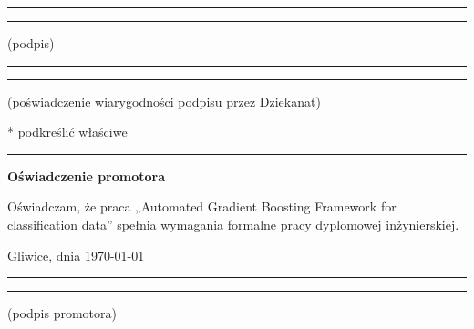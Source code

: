 \documentclass[a4paper,twoside,12pt]{book}
\newcounter{PagesWithoutNumbers}
\newcommand{\Title}{Automated Gradient Boosting Framework for classification data}
\begin{document}
\vfill

\rule{0.5\textwidth}{0cm}\dotfill

\rule{0.5\textwidth}{0cm}
\begin{minipage}{0.45\textwidth}
{\begin{center}(podpis)\end{center}}
\end{minipage}

\vfill

\rule{0.5\textwidth}{0cm}\dotfill

\rule{0.5\textwidth}{0cm}
\begin{minipage}{0.45\textwidth}
{\begin{center}\rule{0mm}{5mm}(poświadczenie wiarygodności podpisu przez Dziekanat)\end{center}}
\end{minipage}


\vfill

* podkreślić właściwe




\cleardoublepage

\rule{1cm}{0cm}

\vfill

\begin{center}
\Large\bfseries Oświadczenie promotora
\end{center}

\vfill

Oświadczam, że praca „\Title” spełnia wymagania formalne pracy dyplomowej inżynierskiej.

\vfill



\vfill

Gliwice, dnia {\today}

\rule{0.5\textwidth}{0cm}\dotfill

\rule{0.5\textwidth}{0cm}
\begin{minipage}{0.45\textwidth}
{\begin{center}(podpis promotora)\end{center}}
\end{minipage}

\vfill



\cleardoublepage


\pagestyle{onlyPageNumbers}
\tableofcontents

\setcounter{PagesWithoutNumbers}{\value{page}}
\mainmatter
\pagestyle{PageNumbersChapterTitles}
\end{document}
